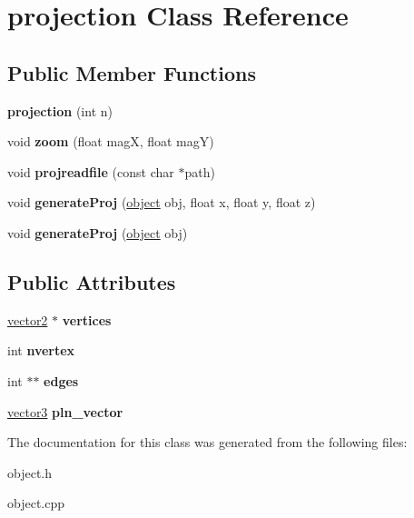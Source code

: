 \hypertarget{classprojection}{}\section{projection Class Reference}
\label{classprojection}
\subsection*{Public Member Functions}
\begin{DoxyCompactItemize}
\item 
\mbox{\label{classprojection_a660f71a095d661f64cf5973b8952216f}} 
{\bfseries projection} (int n)
\item 
\mbox{\label{classprojection_a3394eefee60b67780983f4b0f07cc35a}} 
void {\bfseries zoom} (float magX, float magY)
\item 
\mbox{\label{classprojection_a549b87e7c508f5a27607e1962d9da631}} 
void {\bfseries projreadfile} (const char $\ast$path)
\item 
\mbox{\label{classprojection_aec972df6eced00655ccd917dc7c49d98}} 
void {\bfseries generate\+Proj} (\mbox{\hyperlink{classobject}{object}} obj, float x, float y, float z)
\item 
\mbox{\label{classprojection_a632e2efe99f9221855d01f2127f88cb2}} 
void {\bfseries generate\+Proj} (\mbox{\hyperlink{classobject}{object}} obj)
\end{DoxyCompactItemize}
\subsection*{Public Attributes}
\begin{DoxyCompactItemize}
\item 
\mbox{\label{classprojection_af0509e93b5a964560410fc369e7756a7}} 
\mbox{\hyperlink{structvector2}{vector2}} $\ast$ {\bfseries vertices}
\item 
\mbox{\label{classprojection_ad8e0a51d328dc553701ecf057cf235fc}} 
int {\bfseries nvertex}
\item 
\mbox{\label{classprojection_a3c075e019b264c1adbaef64e7a06e161}} 
int $\ast$$\ast$ {\bfseries edges}
\item 
\mbox{\label{classprojection_adbad939a98f4d4c6b5bed8122d6b9e84}} 
\mbox{\hyperlink{structvector3}{vector3}} {\bfseries pln\+\_\+vector}
\end{DoxyCompactItemize}


The documentation for this class was generated from the following files\+:\begin{DoxyCompactItemize}
\item 
object.\+h\item 
object.\+cpp\end{DoxyCompactItemize}
